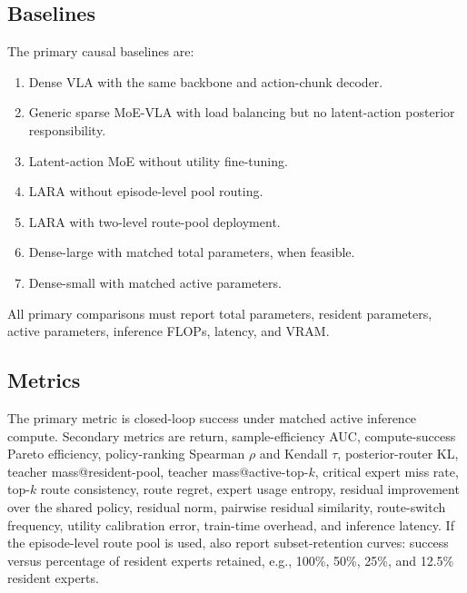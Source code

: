 \documentclass[10pt]{article}
\begin{document}
\subsection{Baselines}

The primary causal baselines are:
\begin{enumerate}
  \item Dense VLA with the same backbone and action-chunk decoder.
  \item Generic sparse MoE-VLA with load balancing but no latent-action posterior responsibility.
  \item Latent-action MoE without utility fine-tuning.
  \item LARA without episode-level pool routing.
  \item LARA with two-level route-pool deployment.
  \item Dense-large with matched total parameters, when feasible.
  \item Dense-small with matched active parameters.
\end{enumerate}
All primary comparisons must report total parameters, resident parameters, active parameters, inference FLOPs, latency, and VRAM.

\subsection{Metrics}

The primary metric is closed-loop success under matched active inference compute. Secondary metrics are return, sample-efficiency AUC, compute-success Pareto efficiency, policy-ranking Spearman $\rho$ and Kendall $\tau$, posterior-router KL, teacher mass@resident-pool, teacher mass@active-top-$k$, critical expert miss rate, top-$k$ route consistency, route regret, expert usage entropy, residual improvement over the shared policy, residual norm, pairwise residual similarity, route-switch frequency, utility calibration error, train-time overhead, and inference latency. If the episode-level route pool is used, also report subset-retention curves: success versus percentage of resident experts retained, e.g., 100\%, 50\%, 25\%, and 12.5\% resident experts.
\end{document}
